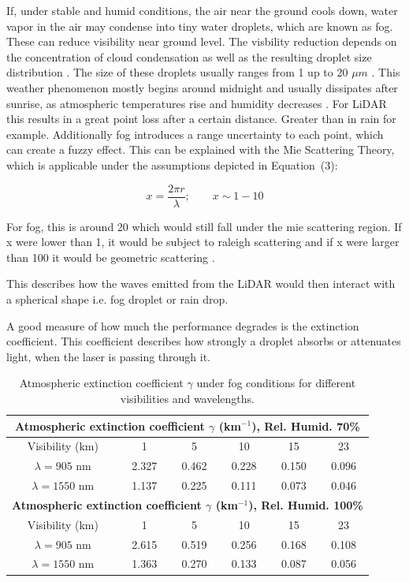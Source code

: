 If, under stable and humid conditions, the air near the ground cools down, water vapor in the air may condense into tiny water droplets, which are known as fog. These can reduce visibility near ground level. The visbility reduction depends on the concentration of cloud condensation as well as the resulting droplet size distribution \cite{noauthor_fog_2023}.
The size of these droplets usually ranges from 1 up to 20 $\mu m$ \cite{awan_spatial_2009}.
This weather phenomenon mostly begins around midnight and usually dissipates after sunrise, as atmospheric temperatures rise and humidity decreases \cite{vargas_overview_2021}. 
For LiDAR this results in a great point loss after a certain distance. Greater than in rain for example. Additionally fog introduces a range uncertainty to each point, which can create a fuzzy effect.
This can be explained with the Mie Scattering Theory, which is applicable under the  assumptions depicted in Equation~(3): 

\begin{equation}
\label{3}
x =
\frac{2\pi r}{\lambda} 
;
\qquad x \sim 1-10
\end{equation}

For fog, this is around 20 which would still fall under the mie scattering region. If x were lower than 1, it would be subject to raleigh scattering and if x were larger than 100 it would be geometric scattering \cite{hasirlioglu_introduction_2017}.

This describes how the waves emitted from the LiDAR would then interact with a spherical shape i.e. fog droplet or rain drop. 

A good measure of how much the performance degrades is the extinction coefficient. This coefficient describes how strongly a droplet absorbs or attenuates light, when the laser is passing through it. 

\begin{table}[htbp]
\centering
\caption{Atmospheric extinction coefficient $\gamma$ under fog conditions for different visibilities and wavelengths.}
\label{tab:extinction_fog}
\begin{tabular}{cccccc}
\toprule
\multicolumn{6}{c}{\textbf{Atmospheric extinction coefficient $\gamma$ (km$^{-1}$), Rel. Humid. 70\%}} \\
\midrule
Visibility (km) & 1 & 5 & 10 & 15 & 23 \\
\midrule
$\lambda = 905$ nm  & 2.327 & 0.462 & 0.228 & 0.150 & 0.096 \\
$\lambda = 1550$ nm & 1.137 & 0.225 & 0.111 & 0.073 & 0.046 \\
\midrule
\multicolumn{6}{c}{\textbf{Atmospheric extinction coefficient $\gamma$ (km$^{-1}$), Rel. Humid. 100\%}} \\
\midrule
Visibility (km) & 1 & 5 & 10 & 15 & 23 \\
\midrule
$\lambda = 905$ nm  & 2.615 & 0.519 & 0.256 & 0.168 & 0.108 \\
$\lambda = 1550$ nm & 1.363 & 0.270 & 0.133 & 0.087 & 0.056 \\
\bottomrule
\end{tabular}
\end{table}

